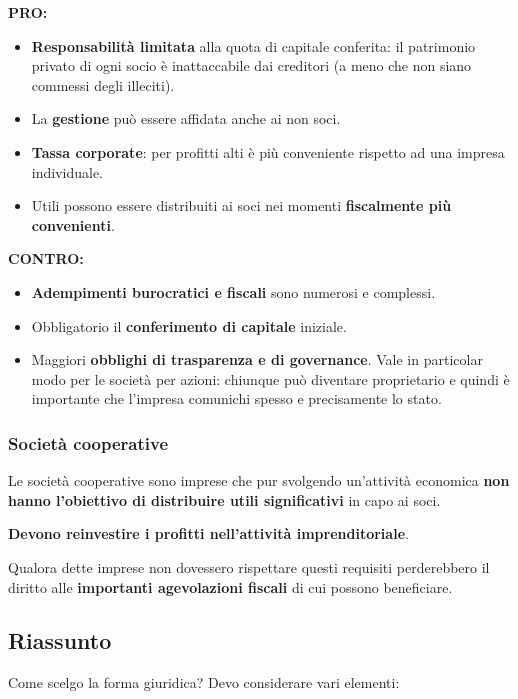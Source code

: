 \documentclass[../main.tex]{subfiles}
\begin{document}
\textbf{PRO:}
\begin{itemize}
\item \textbf{Responsabilità limitata} alla quota di capitale conferita: il patrimonio privato di ogni socio è inattaccabile dai creditori (a meno che non siano commessi degli illeciti).
\item La \textbf{gestione} può essere affidata anche ai non soci.
\item \textbf{Tassa corporate}: per profitti alti è più conveniente rispetto ad una impresa individuale.
\item Utili possono essere distribuiti ai soci nei momenti \textbf{fiscalmente più convenienti}.

\end{itemize}

\textbf{CONTRO:}
\begin{itemize}
\item \textbf{Adempimenti burocratici e fiscali} sono numerosi e complessi.
\item Obbligatorio il \textbf{conferimento di capitale} iniziale.
\item Maggiori \textbf{obblighi di trasparenza e di governance}. Vale in particolar modo per le società per azioni: chiunque può diventare proprietario e quindi è importante che l'impresa comunichi spesso e precisamente lo stato.

\end{itemize}

\subsubsection{Società cooperative}

Le società cooperative sono imprese che pur svolgendo un'attività economica \textbf{non hanno l'obiettivo di distribuire utili significativi} in capo ai soci.

\textbf{Devono reinvestire i profitti nell'attività imprenditoriale}.

Qualora dette imprese non dovessero rispettare questi requisiti perderebbero il diritto alle \textbf{importanti agevolazioni fiscali} di cui possono beneficiare.

\subsection{Riassunto}

Come scelgo la forma giuridica? Devo considerare vari elementi:
\end{document}
